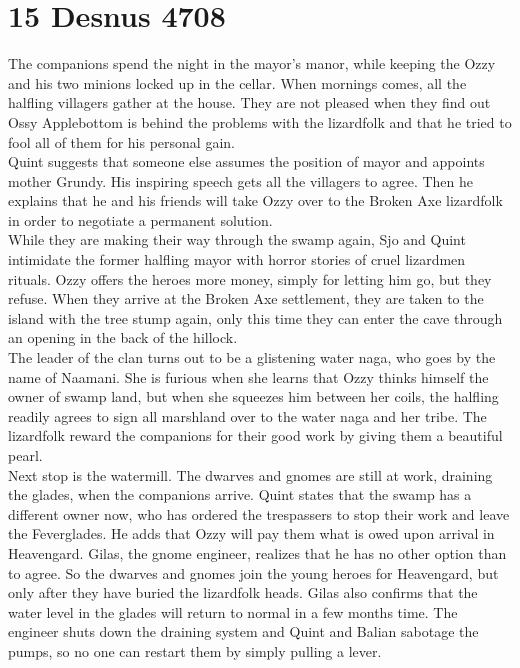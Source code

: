 \section{15 Desnus 4708}

The companions spend the night in the mayor's manor, while keeping the Ozzy and his two minions locked up in the cellar. When mornings comes, all the halfling villagers gather at the house. They are not pleased when they find out Ossy Applebottom is behind the problems with the lizardfolk and that he tried to fool all of them for his personal gain.\\

Quint suggests that someone else assumes the position of mayor and appoints mother Grundy. His inspiring speech gets all the villagers to agree. Then he explains that he and his friends will take Ozzy over to the Broken Axe lizardfolk in order to negotiate a permanent solution.\\

While they are making their way through the swamp again, Sjo and Quint intimidate the former halfling mayor with horror stories of cruel lizardmen rituals. Ozzy offers the heroes more money, simply for letting him go, but they refuse. When they arrive at the Broken Axe settlement, they are taken to the island with the tree stump again, only this time they can enter the cave through an opening in the back of the hillock.\\

The leader of the clan turns out to be a glistening water naga, who goes by the name of Naamani. She is furious when she learns that Ozzy thinks himself the owner of swamp land, but when she squeezes him between her coils, the halfling readily agrees to sign all marshland over to the water naga and her tribe. The lizardfolk reward the companions for their good work by giving them a beautiful pearl.\\

Next stop is the watermill. The dwarves and gnomes are still at work, draining the glades, when the companions arrive. Quint states that the swamp has a different owner now, who has ordered the trespassers to stop their work and leave the Feverglades. He adds that Ozzy will pay them what is owed upon arrival in Heavengard. Gilas, the gnome engineer, realizes that he has no other option than to agree. So the dwarves and gnomes join the young heroes for Heavengard, but only after they have buried the lizardfolk heads. Gilas also confirms that the water level in the glades will return to normal in a few months time. The engineer shuts down the draining system and Quint and Balian sabotage the pumps, so no one can restart them by simply pulling a lever.\\

